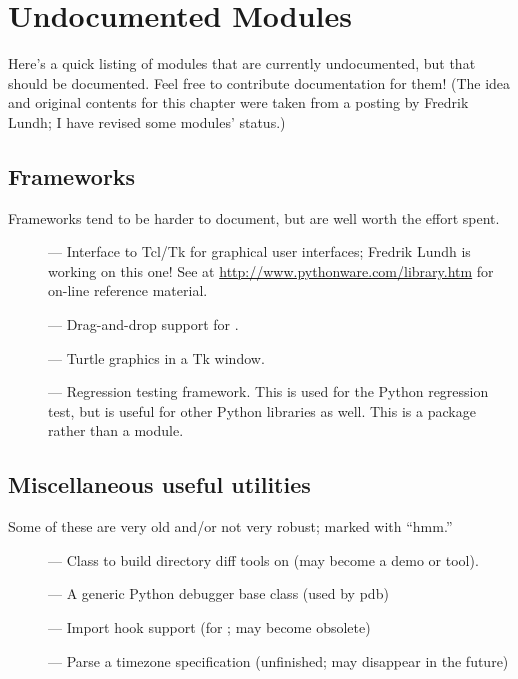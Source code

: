 \chapter{Undocumented Modules}
\label{undoc}

Here's a quick listing of modules that are currently undocumented, but
that should be documented.  Feel free to contribute documentation for
them!  (The idea and original contents for this chapter were taken
from a posting by Fredrik Lundh; I have revised some modules' status.)


\section{Frameworks}

Frameworks tend to be harder to document, but are well worth the
effort spent.

\begin{description}
\item[]
--- Interface to Tcl/Tk for graphical user interfaces; Fredrik Lundh
is working on this one!  See
 at \url{http://www.pythonware.com/library.htm} for on-line
reference material.

\item[]
--- Drag-and-drop support for .

\item[]
--- Turtle graphics in a Tk window.

\item[]
--- Regression testing framework.  This is used for the Python
regression test, but is useful for other Python libraries as well.
This is a package rather than a module.
\end{description}


\section{Miscellaneous useful utilities}

Some of these are very old and/or not very robust; marked with ``hmm.''

\begin{description}
\item[]
--- Class to build directory diff tools on (may become a demo or tool).

\item[]
--- A generic Python debugger base class (used by pdb)

\item[]
--- Import hook support (for ; may become obsolete)

\item[]
--- Parse a timezone specification (unfinished; may disappear in the
future)
\end{description}


